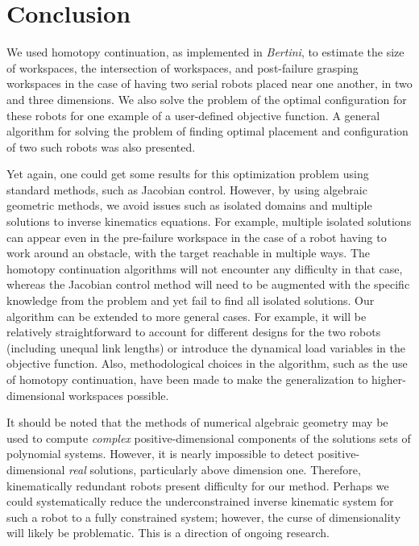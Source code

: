 \documentclass[12pt]{report}
\begin{document}
\section{Conclusion}


We used homotopy continuation, as implemented in \emph{Bertini}, to estimate the size of workspaces, the intersection of workspaces, and post-failure grasping workspaces in the case of having two  serial robots placed near one another, in two and three dimensions. We also solve the problem of the optimal configuration for these robots for one example of a user-defined objective function.  A general algorithm for solving the problem of finding optimal placement and configuration of two such robots was also presented.   

Yet again, one could get some results for this optimization problem using standard methods, such as Jacobian control.  However, by using algebraic geometric methods, we avoid issues such as isolated domains and multiple solutions to inverse kinematics equations.  For example, multiple isolated solutions can appear even in the pre-failure workspace in the case of a robot having to work around an obstacle, with the target reachable in multiple ways. The homotopy continuation algorithms will not encounter any difficulty in that case, whereas the Jacobian control method will need to be augmented with the specific knowledge from the problem and yet fail to find all isolated solutions. Our algorithm can be extended to more general cases.  For example,  it will be relatively straightforward to  account for different designs for the two robots (including unequal link lengths) or introduce the dynamical load variables in the objective function.  Also, methodological choices in the algorithm, such as the use of homotopy continuation, have been made to make the 
generalization  to higher-dimensional workspaces possible. 

It should be noted that the methods of numerical algebraic geometry may be used to compute {\em complex} positive-dimensional components of the solutions sets of polynomial systems.  However, it is nearly impossible to detect positive-dimensional {\em real} solutions, particularly above dimension one.   Therefore, kinematically redundant robots present difficulty for our method.  Perhaps we could systematically reduce the underconstrained inverse kinematic system for such a robot to a fully constrained system; however, the curse of dimensionality will likely be problematic.  This is a direction of ongoing research.
\end{document}
